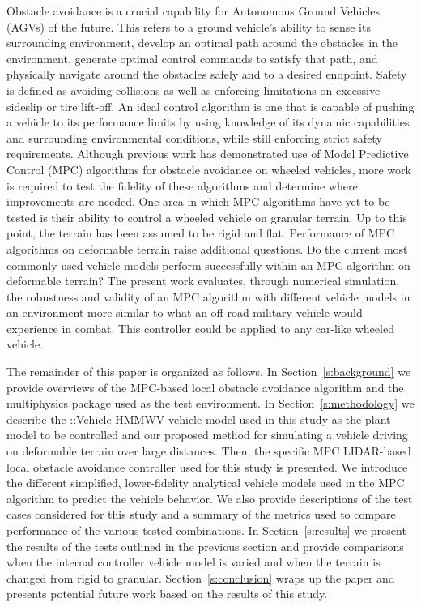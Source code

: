\documentclass[12pt,onecolumn]{article}
\newcommand{\CHRONO}{{\sffamily{{Chrono}}}}
\newcommand{\ChronoVehicle}{{\sffamily{Chrono}}::Vehicle}
\begin{document}
Obstacle avoidance is a crucial capability for Autonomous Ground Vehicles (AGVs) of the future. This refers to a ground vehicle's ability to sense its surrounding environment, develop an optimal path around the obstacles in the environment, generate optimal control commands to satisfy that path, and physically navigate around the obstacles safely and to a desired endpoint. Safety is defined as avoiding collisions as well as enforcing limitations on excessive sideslip or tire lift-off. An ideal control algorithm is one that is capable of pushing a vehicle to its performance limits by using knowledge of its dynamic capabilities and surrounding environmental conditions, while still enforcing strict safety requirements. Although previous work has demonstrated use of Model Predictive Control (MPC) algorithms for obstacle avoidance on wheeled vehicles, more work is required to test the fidelity of these algorithms and determine where improvements are needed. One area in which MPC algorithms have yet to be tested is their ability to control a wheeled vehicle on granular terrain. Up to this point, the terrain has been assumed to be rigid and flat. Performance of MPC algorithms on deformable terrain raise additional questions. Do the current most commonly used vehicle models perform successfully within an MPC algorithm on deformable terrain? The present work evaluates, through numerical simulation, the robustness and validity of an MPC algorithm with different vehicle models in an environment more similar to what an off-road military vehicle would experience in combat. This controller could be applied to any car-like wheeled vehicle.

The remainder of this paper is organized as follows.  In Section~\ref{s:background} we provide overviews of the MPC-based local obstacle avoidance algorithm and the {\CHRONO} multiphysics package used as the test environment. In Section~\ref{s:methodology} we describe the {\ChronoVehicle} HMMWV vehicle model used in this study as the plant model to be controlled and our proposed method for simulating a vehicle driving on deformable terrain over large distances. Then, the specific MPC LIDAR-based local obstacle avoidance controller used for this study is presented. We introduce the different simplified, lower-fidelity analytical vehicle models used in the MPC algorithm to predict the {\CHRONO} vehicle behavior. We also provide descriptions of the test cases considered for this study and a summary of the metrics used to compare performance of the various tested combinations. In Section~\ref{s:results} we present the results of the tests outlined in the previous section and provide comparisons when the internal controller vehicle model is varied and when the terrain is changed from rigid to granular. Section~\ref{s:conclusion} wraps up the paper and presents potential future work based on the results of this study.
\end{document}
